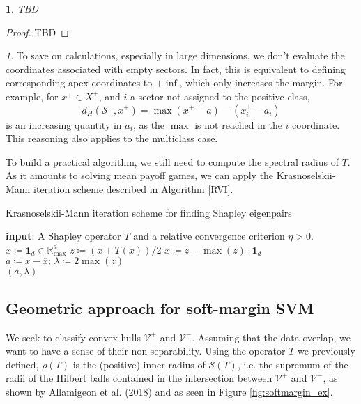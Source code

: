 \documentclass[oneside,UKenglish,a4paper]{amsart}
\numberwithin{equation}{section}
\numberwithin{figure}{section}
\theoremstyle{plain}
\theoremstyle{definition}
\theoremstyle{plain}
\newtheorem{prop}[thm]{\protect\propositionname}
\theoremstyle{remark}
\newtheorem{rem}[thm]{\protect\remarkname}
\theoremstyle{plain}
\theoremstyle{definition}
\theoremstyle{definition}
\providecommand{\propositionname}{Proposition}
\providecommand{\remarkname}{Remark}
\newcommand{\Input}{\textbf{input}}
\begin{document}
\begin{prop}\label{prop:SectorInterpretation}
TBD
\end{prop}

\begin{proof}
TBD
\end{proof}

\begin{rem}\label{rem:UnreachedSectors}
To save on calculations, especially in large dimensions, we don't evaluate the coordinates associated with empty sectors. In fact, this is equivalent to defining corresponding apex coordinates to $+\inf$, which only increases the margin. For example, for $x^+\in X^+$, and $i$ a sector not assigned to the positive class, $$d_H(\mathcal{S}^-, x^+)=\max(x^+-a) - (x^+_i - a_i)$$ is an increasing quantity in $a_i$, as the $\max$ is not reached in the $i$ coordinate. This reasoning also applies to the multiclass case.
\end{rem}

%
To build a practical algorithm, we still need to compute the spectral
radius of $T$. As it amounts to solving mean payoff games, we can apply the Krasnoselskii-Mann iteration scheme described in Algorithm \ref{RVI}.
\begin{algorithm}[h!]
\caption{Krasnoselskii-Mann iteration scheme for finding Shapley eigenpairs}\label{RVI}
\begin{algorithmic}[1]
  \State \Input: A Shapley operator $T$ and a relative convergence criterion $\eta>0$.
\State $ x \coloneqq  \mathbf{1}_d \in \mathbb{R}_{\max}^d $
%
\Repeat \State $z \coloneqq  \left(x + T(x)\right)/2$
\State $x \coloneqq z - \max(z)\cdot\textbf{1}_d$
%
\State $a \coloneqq  x-\overline{x}; \, \lambda \coloneqq 2 \max(z)$\\

\Return $(a, \lambda)$
\end{algorithmic}
\end{algorithm}


\subsection{Geometric approach for soft-margin SVM}

We seek to classify convex hulls $\mathcal{V}^{+}$ and $\mathcal{V}^{-}$.
Assuming that the data overlap, we want to have a sense of their
non-separability. Using the operator $T$ we previously defined,  $\rho(T)$ is the
(positive) inner radius of $\mathcal{S}(T)$, i.e. the supremum of
the radii of the Hilbert balls contained in the intersection between
$\mathcal{V}^{+}$ and $\mathcal{V}^{-}$, as shown by Allamigeon et al. (2018) \cite{Allamigeon2018} and as seen in Figure \ref{fig:softmargin_ex}.
\end{document}
